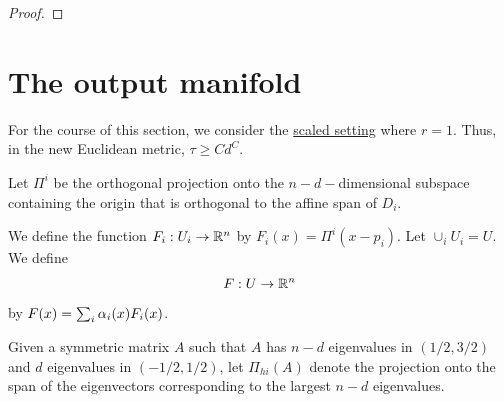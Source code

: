 \documentclass[final, 12pt]{colt2018} %
\begin{document}
\begin{proof}

\end{proof}
\section{The output manifold}
For the course of this section, we consider the \underline{scaled setting} where $r=1$. Thus, in the new Euclidean metric, $\tau \geq Cd^C$.

Let $\Pi^i$ be the orthogonal projection onto the $n-d-$dimensional subspace containing the origin that is orthogonal to the affine span of $D_i$.

We define the function $F_i:U_i \rightarrow \mathbb R^n$ by $F_i(x) =\Pi^i (x - p_i)$. Let $\cup_i U_i = U$.
We define $$F:U \rightarrow \mathbb R^n$$ by $F(x) = \sum_i \alpha_i(x) F_i(x)$.

 Given a symmetric matrix $A$ such that $A$ has $n-d$ eigenvalues in $(1/2 , 3/2)$ and $d$ eigenvalues in $(-1/2, 1/2)$, let $\Pi_{hi}(A)$ denote the projection onto the span of the eigenvectors corresponding to the largest $n-d$ eigenvalues.
\end{document}
